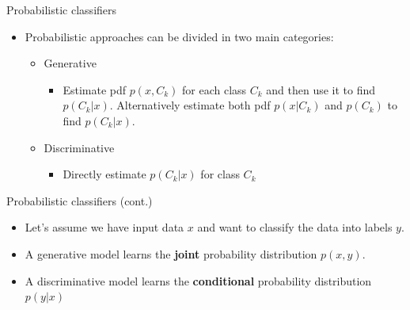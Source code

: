 \documentclass[serif, aspectratio=169]{beamer}
\begin{document}
\begin{frame}{Probabilistic classifiers}
    \begin{itemize}
        \item Probabilistic approaches can be divided in two main categories:
            \begin{itemize}
                \item Generative
                    \begin{itemize}
                        \item Estimate pdf $p(x, C_k)$ for each class $C_k$ and then use it to find $p(C_k|x)$. Alternatively estimate both pdf $p(x|C_k)$ and $p(C_k)$ to find $p(C_k|x)$.
                    \end{itemize}
                \item Discriminative
                    \begin{itemize}
                        \item Directly estimate $p(C_k|x)$ for class $C_k$
                    \end{itemize}
            \end{itemize}
    \end{itemize}
\end{frame}
\begin{frame}{Probabilistic classifiers (cont.)}
    \begin{itemize}
        \item Let's assume we have input data $x$ and want to classify the data into labels $y$.
        \item A generative model learns the \textbf{joint} probability distribution $p(x,y)$.
            
        \item A discriminative model learns the \textbf{conditional} probability distribution $p(y|x)$
           
    \end{itemize}
\end{frame}
\end{document}
